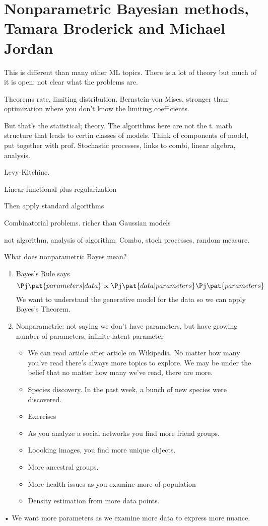 \section{Nonparametric Bayesian methods, Tamara Broderick and Michael Jordan}

This is different than many other ML topics. There is a lot of theory but much of it is open: not clear what the problems are.

Theorems rate, limiting distribution. Bernstein-von Mises, stronger than optimization where you don't know the limiting coefficients.

But that's the statistical; theory. The algorithms here are not the t. math structure that leads to certin classes of models. Think of components of model, put together with prof. Stochastic processes, links to combi, linear algebra, analysis.

Levy-Kitchine. 

Linear functional plus regularization


Then apply standard algorithms

Combinatorial problems. 
richer than Gaussian models

not algorithm, analysis of algorithm. Combo, stoch processes, random measure.

What does nonparametric Bayes mean?
\begin{enumerate}
\item
Bayes's Rule says
$$
\Pj\pat{parameters|data} \propto \Pj\pat{data|parameters} \Pj\pat{parameters}
$$
We want to understand the generative model for the data so we can apply Bayes's Theorem.

\item Nonparametric: %
not saying we don't have parameters, but have growing number of parameters, infinite latent parameter

\begin{itemize}
\item
We can read article after article on Wikipedia. No matter how many you've read there's always more topics to explore. We may be under the belief that no matter how many we've read, there are more. 
\item
Species discovery. In the past week, a bunch of new species were discovered.
\item
Exercises
\item As you analyze a social networks you find more friend groups.
\item
Loooking images, you find more unique objects.
\item
More ancestral groups.
\item
More health issues as you examine more of population
\item
Density estimation from more data points. %
\end{itemize}


\end{enumerate}•
We want more parameters as we examine more data to express more nuance.

